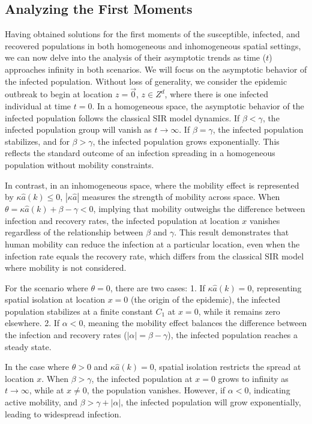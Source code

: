 \documentclass[sn-basic]{sn-jnl}%
\theoremstyle{thmstyleone}%
\theoremstyle{thmstyletwo}%
\theoremstyle{thmstylethree}%
\numberwithin{equation}{theorem}
\begin{document}
\subsection{Analyzing the First Moments}
Having obtained solutions for the first moments of the susceptible, infected, and recovered populations in both homogeneous and inhomogeneous spatial settings, we can now delve into the analysis of their asymptotic trends as time ($t$) approaches infinity in both scenarios. We will focus on the asymptotic behavior of the infected population. Without loss of generality, we consider the epidemic outbreak to begin at location $z=\Vec{0}$, $z\in Z^d$, where there is one infected individual at time $t=0$. 
In a homogeneous space, the asymptotic behavior of the infected population follows the classical SIR model dynamics. If $\beta < \gamma$, the infected population group will vanish as $t \to \infty$. If $\beta = \gamma$, the infected population stabilizes, and for $\beta > \gamma$, the infected population grows exponentially. This reflects the standard outcome of an infection spreading in a homogeneous population without mobility constraints.

In contrast, in an inhomogeneous space, where the mobility effect is represented by $\kappa \hat{a}(k) \leq 0$, $|\kappa \hat{a}|$ measures the strength of mobility across space. When $\theta = \kappa \hat{a}(k) + \beta - \gamma < 0$, implying that mobility outweighs the difference between infection and recovery rates, the infected population at location $x$ vanishes regardless of the relationship between $\beta$ and $\gamma$. This result demonstrates that human mobility can reduce the infection at a particular location, even when the infection rate equals the recovery rate, which differs from the classical SIR model where mobility is not considered.

For the scenario where $\theta = 0$, there are two cases: 
1. If $\kappa \hat{a}(k) = 0$, representing spatial isolation at location $x = 0$ (the origin of the epidemic), the infected population stabilizes at a finite constant $C_1$ at $x=0$, while it remains zero elsewhere. 
2. If $\alpha < 0$, meaning the mobility effect balances the difference between the infection and recovery rates ($|\alpha| = \beta - \gamma$), the infected population reaches a steady state.

In the case where $\theta > 0$ and $\kappa \hat{a}(k) = 0$, spatial isolation restricts the spread at location $x$. When $\beta > \gamma$, the infected population at $x = 0$ grows to infinity as $t \to \infty$, while at $x \neq 0$, the population vanishes. However, if $\alpha < 0$, indicating active mobility, and $\beta > \gamma + |\alpha|$, the infected population will grow exponentially, leading to widespread infection.
\end{document}
